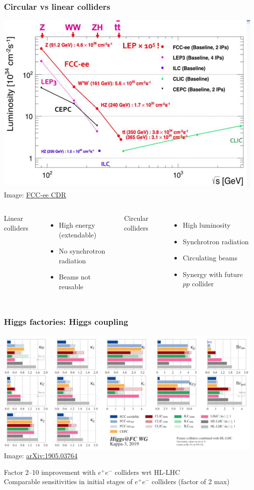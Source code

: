 \documentclass[aspectratio=169]{beamer}
\newcommand{\bluetext}[1]{%
  \textcolor{myBlue}{#1}
}
\begin{document}
\begin{frame}
  \frametitle{Circular vs linear colliders}

  \begin{center}
    \includegraphics[width=0.4\linewidth]{figures/Luminosity_vs_energy_v1.png}\\
     \tiny{Image: \href{https://cds.cern.ch/record/2651299?ln=en}{FCC-ee CDR}}
  \end{center}
  \vspace{1ex}
  \pause%

  \begin{columns}
     \bluetext{Linear colliders}
     \begin{itemize}
     \item High energy (extendable)
     \item No synchrotron radiation
     \item Beams not reusable
     \end{itemize}
     \pause%

     \bluetext{Circular colliders}
     \begin{itemize}
     \item High luminosity
     \item Synchrotron radiation
     \item Circulating beams
     \item Synergy with future $pp$ collider
     \end{itemize}
   \end{columns}
\end{frame}


\begin{frame}
  \frametitle{Higgs factories: Higgs coupling}
  \begin{center}
    \includegraphics[width=0.85\linewidth]{figures/kappa.png}\\
    \tiny{Image: \href{https://arxiv.org/abs/1905.03764}{arXiv:1905.03764}}
  \end{center}
  \pause%

  Factor 2--10 improvement with $e^+e^-$ colliders wrt HL-LHC\\
  Comparable sensitivities in initial stages of $e^+e^-$ colliders (factor of 2 max)
\end{frame}
\end{document}

